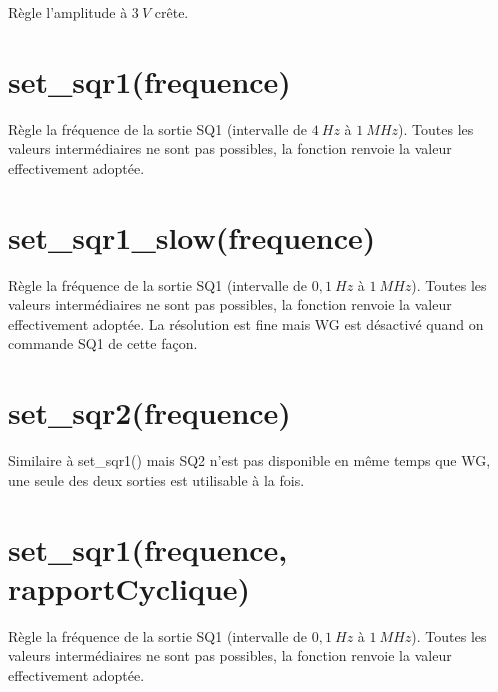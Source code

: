 \documentclass[a4paper,12pt,french]{sphinxmanual}
\begin{document}
\begin{sphinxVerbatim}[commandchars=\\\{\}]
\end{sphinxVerbatim}

Règle l’amplitude à \(3~V\) crête.


\section{set\_sqr1(frequence)}
\label{\detokenize{9.0:set-sqr1-frequence}}
Règle la fréquence de la sortie SQ1 (intervalle de \(4~Hz\) à \(1~MHz\)).
Toutes les valeurs intermédiaires ne sont pas possibles, la fonction
renvoie la valeur effectivement adoptée.

\begin{sphinxVerbatim}[commandchars=\\\{\}]
 
\end{sphinxVerbatim}



\section{set\_sqr1\_slow(frequence)}
\label{\detokenize{9.0:set-sqr1-slow-frequence}}
Règle la fréquence de la sortie SQ1 (intervalle de \(0,1~Hz\) à \(1~MHz\)).
Toutes les valeurs intermédiaires ne sont pas possibles, la fonction
renvoie la valeur effectivement adoptée. La résolution est fine mais
WG est désactivé quand on commande SQ1 de cette façon.

\begin{sphinxVerbatim}[commandchars=\\\{\}]
 
\end{sphinxVerbatim}


\section{set\_sqr2(frequence)}
\label{\detokenize{9.0:set-sqr2-frequence}}
Similaire à set\_sqr1() mais SQ2 n’est pas disponible en même temps
que WG, une seule des deux sorties est utilisable à la fois.


\section{set\_sqr1(frequence, rapportCyclique)}
\label{\detokenize{9.0:set-sqr1-frequence-rapportcyclique}}
Règle la fréquence de la sortie SQ1 (intervalle de \(0,1~Hz\) à \(1~MHz\)).
Toutes les valeurs intermédiaires ne sont pas possibles, la fonction
renvoie la valeur effectivement adoptée.
\end{document}
